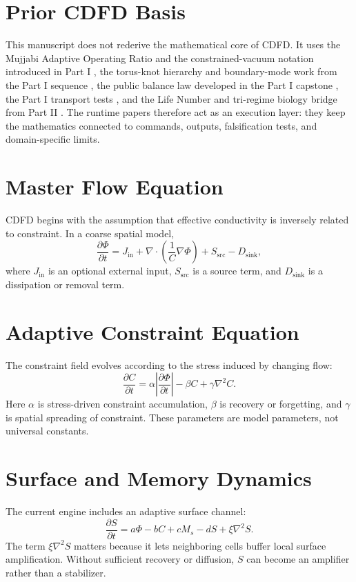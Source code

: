 \documentclass[12pt,a4paper]{article}
\begin{document}
\section{Prior CDFD Basis}
This manuscript does not rederive the mathematical core of CDFD. It uses the
Mujjabi Adaptive Operating Ratio and the constrained-vacuum notation introduced
in Part I \cite{MujjabiI2026}, the torus-knot hierarchy and boundary-mode work
from the Part I sequence \cite{MujjabiVI2026,MujjabiIX2026}, the public balance
law developed in the Part I capstone \cite{MujjabiX2026}, the Part I transport
tests \cite{MujjabiXII2026}, and the Life Number and tri-regime biology bridge
from Part II \cite{MujjabiPartII2026}. The runtime papers therefore act as an
execution layer: they keep the mathematics connected to commands, outputs,
falsification tests, and domain-specific limits.


\section{Master Flow Equation}
CDFD begins with the assumption that effective conductivity is inversely related
to constraint. In a coarse spatial model,
\begin{equation}
    \frac{\partial \Phi}{\partial t}
    =
    J_{\mathrm{in}}
    + \nabla \cdot \left(\frac{1}{C}\nabla \Phi\right)
    + S_{\mathrm{src}}
    - D_{\mathrm{sink}},
\end{equation}
where $J_{\mathrm{in}}$ is an optional external input, $S_{\mathrm{src}}$ is a
source term, and $D_{\mathrm{sink}}$ is a dissipation or removal term.

\section{Adaptive Constraint Equation}
The constraint field evolves according to the stress induced by changing flow:
\begin{equation}
    \frac{\partial C}{\partial t}
    =
    \alpha \left|\frac{\partial \Phi}{\partial t}\right|
    - \beta C
    + \gamma \nabla^2 C.
\end{equation}
Here $\alpha$ is stress-driven constraint accumulation, $\beta$ is recovery or
forgetting, and $\gamma$ is spatial spreading of constraint. These parameters
are model parameters, not universal constants.

\section{Surface and Memory Dynamics}
The current engine includes an adaptive surface channel:
\begin{equation}
    \frac{\partial S}{\partial t}
    =
    a\Phi - bC + cM_s - dS + \xi\nabla^2 S.
\end{equation}
The term $\xi\nabla^2 S$ matters because it lets neighboring cells buffer local
surface amplification. Without sufficient recovery or diffusion, $S$ can become
an amplifier rather than a stabilizer.
\end{document}
